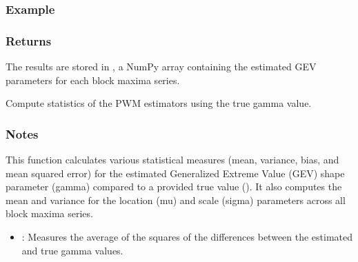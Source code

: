 \documentclass[a4paper,11pt,openany,english]{sphinxmanual}
\begin{document}
\begin{fulllineitems}
\begin{fulllineitems}
\subsubsection{Example}
\label{\detokenize{api_topt:id34}}
\begin{sphinxVerbatim}[commandchars=\\\{\}]
  
\PYG{g+go}{array([[0.2, 1.1, 0.8],}
\PYG{g+go}{    [0.3, 1.2, 0.9]])}
\end{sphinxVerbatim}


\subsubsection{Returns}
\label{\detokenize{api_topt:id35}}\begin{description}
\sphinxAtStartPar
The results are stored in , a NumPy array containing the estimated GEV parameters for each block maxima series.

\end{description}

\end{fulllineitems}


\begin{fulllineitems}
\label{\detokenize{api_topt:xtremes.topt.PWM_estimators.get_statistics}}
\pysigstartsignatures
{}
\pysigstopsignatures
\sphinxAtStartPar
Compute statistics of the PWM estimators using the true gamma value.


\subsubsection{Notes}
\label{\detokenize{api_topt:id36}}
\sphinxAtStartPar
This function calculates various statistical measures (mean, variance, bias, and mean squared error) for the estimated 
Generalized Extreme Value (GEV) shape parameter (gamma) compared to a provided true value (). It also computes 
the mean and variance for the location (mu) and scale (sigma) parameters across all block maxima series.
\begin{itemize}
\item {} 
\sphinxAtStartPar
{}: Measures the average of the squares of the differences between the estimated and true gamma values.


\end{itemize}
\end{fulllineitems}
\end{fulllineitems}
\end{document}
